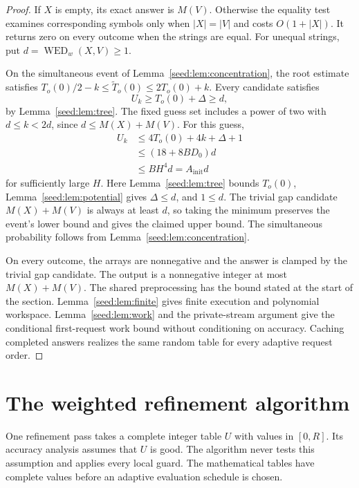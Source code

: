 \documentclass[11pt]{article}
\theoremstyle{definition}
\newcommand{\WED}{\operatorname{WED}}
\newcommand{\1}{\mathbf 1}
\begin{document}
\begin{proof}
If $X$ is empty, its exact answer is $M(V)$. Otherwise the equality test
examines corresponding symbols only when $|X|=|V|$ and costs $O(1+|X|)$.
It returns zero on every outcome when the strings are equal. For unequal
strings, put $d=\WED_w(X,V)\ge1$.

On the simultaneous event of Lemma~\ref{seed:lem:concentration}, the
root estimate satisfies $T_o(0)/2-k\le\widetilde T_o(0)\le2T_o(0)+k$.
Every candidate satisfies
\[
 U_k\ge T_o(0)+\Delta\ge d,
\]
by Lemma~\ref{seed:lem:tree}. The fixed guess set includes a power of two
with $d\le k<2d$, since $d\le M(X)+M(V)$. For this guess,
\begin{align*}
 U_k
 &\le4T_o(0)+4k+\Delta+1\\
 &\le(18+8BD_0)d\\
 &\le BH^4d=A_{\mathrm{init}}d
\end{align*}
for sufficiently large $H$. Here Lemma~\ref{seed:lem:tree} bounds
$T_o(0)$, Lemma~\ref{seed:lem:potential} gives $\Delta\le d$, and
$1\le d$. The trivial gap candidate $M(X)+M(V)$ is always at least $d$,
so taking the minimum preserves the event's lower bound and gives the
claimed upper bound. The simultaneous probability follows from
Lemma~\ref{seed:lem:concentration}.

On every outcome, the arrays are nonnegative and the answer is clamped
by the trivial gap candidate. The output is a nonnegative integer at
most $M(X)+M(V)$. The shared preprocessing has the bound
stated at the start of the section. Lemma~\ref{seed:lem:finite} gives
finite execution and polynomial workspace. Lemma~\ref{seed:lem:work}
and the private-stream argument give the conditional first-request work
bound without conditioning on accuracy. Caching completed answers
realizes the same random table for every adaptive request order.
\end{proof}


\section{The weighted refinement algorithm}\label{paper:sec:refinement}

One refinement pass takes a complete integer table $U$ with values in
$[0,R]$. Its accuracy analysis assumes that $U$ is good.
The algorithm never tests this assumption and applies every local guard.
The mathematical tables have complete values before an adaptive
evaluation schedule is chosen.
\end{document}
